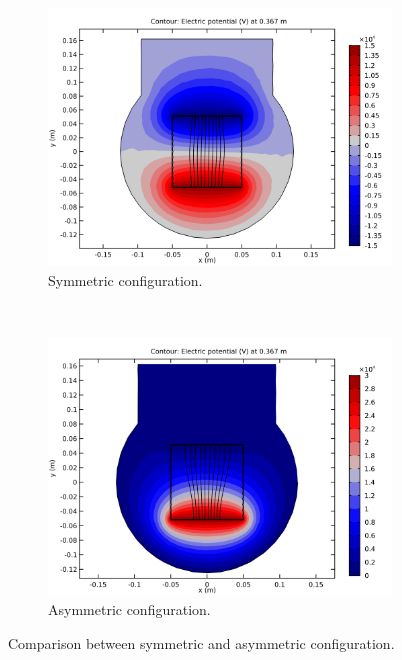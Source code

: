 \begin{figure}[!ht]
	\begin{subfigure}{0.5\textwidth}
		\includegraphics[width=\textwidth]{03_Prototype/figures/fig021_image_asym_sym_b.png}
		\caption{Symmetric configuration.}
		\label{chap3:asym_sym_b}
	\end{subfigure}
	~
	\begin{subfigure}{0.5\textwidth}
		\includegraphics[width=\textwidth]{03_Prototype/figures/fig021_image_asym_sym_a.png}
		\caption{Asymmetric configuration.}
		\label{chap3:asym_sym_a}
	\end{subfigure}
	\caption[Comparison between symmetric and asymmetric configuration]{Comparison between symmetric and asymmetric configuration.}
	\label{chap3:asym_sym}
\end{figure}
